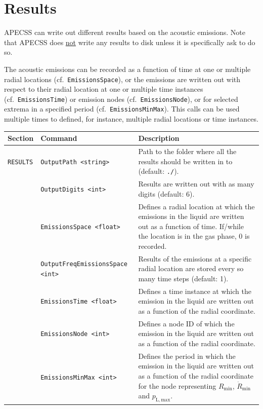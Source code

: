 \section{Results}
\label{sec:emissions_results}

APECSS can write out different results based on the acoustic emissions. Note that APECSS does \uline{not} write any results to disk unless it is specifically ask to do so.

The acoustic emissions can be recorded as a function of time at one or multiple radial locations (cf.~{\tt EmissionsSpace}), or the emissions are written out with respect to their radial location at one or multiple time instances (cf.~{\tt EmissionsTime}) or emission nodes (cf.~{\tt EmissionsNode}), or for selected extrema in a specified period (cf.~{\tt EmissionsMinMax}). This calls can be used multiple times to defined, for instance, multiple radial locations or time instances.

\vspace{0.8em}

\noindent
\begin{tabular}{p{} p{} p{}}
    \textbf{Section} &\textbf{Command} & \textbf{Description} 
\vspace{1mm} \\ \hline
{\tt RESULTS} & {\tt OutputPath <string>} & Path to the folder where all the results should be written in to (default: {\tt ./}).\\
& {\tt OutputDigits <int>} & Results are written out with as many digits (default: 6).\\
& {\tt EmissionsSpace <float>} & Defines a radial location at which the emissions in the liquid are written out as a function of time. If/while the location is in the gas phase, $0$ is recorded.\\ 
& {\tt OutputFreqEmissionsSpace <int>} & Results of the emissions at a specific radial location are stored every so many time steps (default: 1).\\ 
& {\tt EmissionsTime <float>} & Defines a time instance at which the emission in the liquid are written out as a function of the radial coordinate.\\ 
& {\tt EmissionsNode <int>} & Defines a node ID of which the emission in the liquid are written out as a function of the radial coordinate.\\ 
& {\tt EmissionsMinMax <int>} & Defines the period in which the emission in the liquid are written out as a function of the radial coordinate for the node representing $R_\mathrm{min}$, $\dot{R}_\mathrm{min}$ and $p_\mathrm{L,max}$.\\ 
 \hline
\end{tabular}

